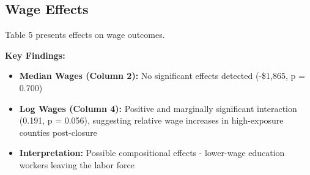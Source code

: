 \documentclass[12pt]{article}
\begin{document}
\clearpage

\subsection{Wage Effects}

Table 5 presents effects on wage outcomes.

\textbf{Key Findings:}

\begin{itemize}
\item \textbf{Median Wages (Column 2):} No significant effects detected (-\$1,865, p = 0.700)

\item \textbf{Log Wages (Column 4):} Positive and marginally significant interaction (0.191, p = 0.056), suggesting relative wage increases in high-exposure counties post-closure

\item \textbf{Interpretation:} Possible compositional effects - lower-wage education workers leaving the labor force
\end{itemize}
\end{document}
